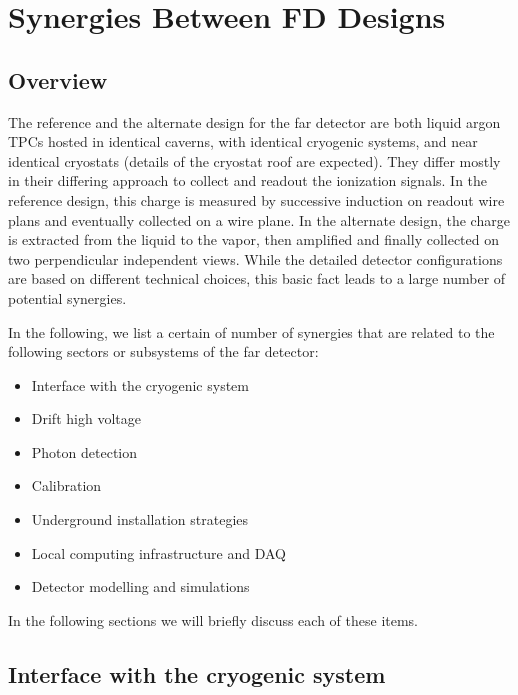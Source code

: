 \chapter{Synergies Between FD Designs}
\label{ch:detectors-synergy}

\section{Overview}

The reference and the alternate design for the far detector are both
liquid argon TPCs hosted in identical caverns, with identical
cryogenic systems, and near identical cryostats (details of the
cryostat roof are expected). They differ mostly in their differing
approach to collect and readout the ionization signals. In the
reference design, this charge is measured by successive induction on
readout wire plans and eventually collected on a wire plane. In the
alternate design, the charge is extracted from the liquid to the
vapor, then amplified and finally collected on two perpendicular
independent views. While the detailed detector configurations are
based on different technical choices, this basic fact leads to a large
number of potential synergies.

In the following, we list a certain of number of synergies that are
related to the following sectors or subsystems of the far detector:
\begin{itemize}
\item Interface with the cryogenic system
\item Drift high voltage 
\item Photon detection
\item Calibration
\item Underground installation strategies
\item Local computing infrastructure and DAQ
\item Detector modelling and simulations
\end{itemize}

In the following sections we will briefly discuss each of these items. 
  


\section{Interface with the cryogenic system}


